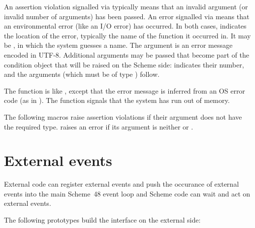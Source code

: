 \noindent{}An assertion violation signalled via
 typically means that an invalid
argument (or invalid number of arguments) has been passed.  An error
signalled via  means that an environmental error
(like an I/O error) has occurred.  In both cases,  indicates
the location of the error, typically the name of the function it
occurred in.  It may be , in which the system guesses a
name.  The  argument is an error message encoded in
UTF-8.  Additional arguments may be passed that become part of the
condition object that will be raised on the Scheme side: 
indicates their number, and the arguments (which must be of type
) follow.

The  function is like , except
that the error message is inferred from an OS error code (as in
).  The  function
signals that the system has run out of memory.

The following macros raise assertion violations if their argument does
not have the required type.   raises an
error if its argument is neither  or .

\begin{protos}
\end{protos}

\section{External events}

External code can register external events and push the occurance of
external events into the main Scheme~48 event loop and Scheme code can
wait and act on external events.

The following prototypes build the interface on the external side:

